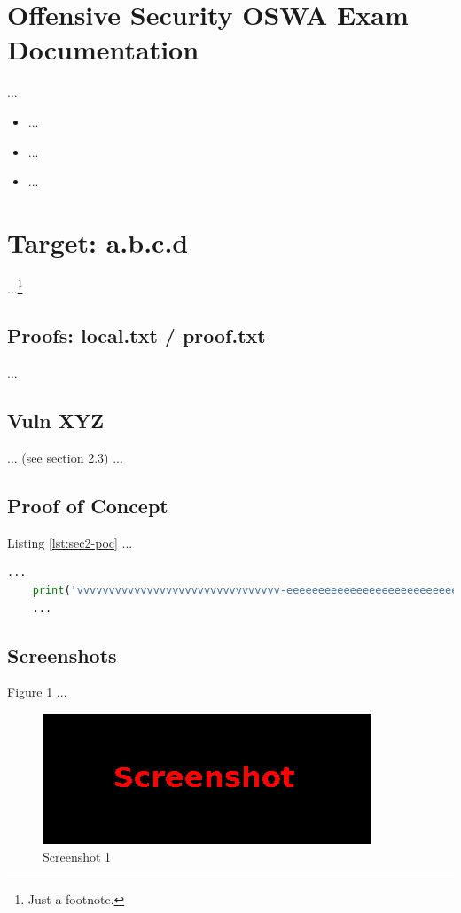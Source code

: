 %
%
%
\section{Offensive Security OSWA Exam Documentation}\label{sec:sec1}
%
...

\begin{itemize}
    \item ...
    \item ...
    \item ...
\end{itemize}
%
%
%
\section{Target: a.b.c.d}\label{sec:sec2}
%
...\footnote{Just a footnote.}
%
%
%
\subsection{Proofs: local.txt / proof.txt}\label{sec:sec2-proofs}
%
...
%
%
%
\subsection{Vuln XYZ}\label{sec:sec2-vuln}
%
... (see section \ref{sec:sec2-poc}) ...

%
%
%
\subsection{Proof of Concept}\label{sec:sec2-poc}
Listing \ref{lst:sec2-poc} ...\\

\begin{lstlisting}[language=Python,caption={Proof of Concept}, label={lst:sec2-poc}]
    ...
    print('vvvvvvvvvvvvvvvvvvvvvvvvvvvvvvvv-eeeeeeeeeeeeeeeeeeeeeeeeeeeeeeeeeeeeeeeeeee-looooooooooooooooooooooong-striiiiiiiiiiiiiing')
    ...
\end{lstlisting}
%
%
%
\subsection{Screenshots}\label{sec:sec2-screen1}
%
Figure \ref{fig:sec2-screen1} ...

\begin{figure}[H]
    \centering
    \includegraphics[width=\textwidth]{img/assignment1/screen1.png}
    \caption{Screenshot 1}\label{fig:sec2-screen1}
\end{figure}
%
%
%
